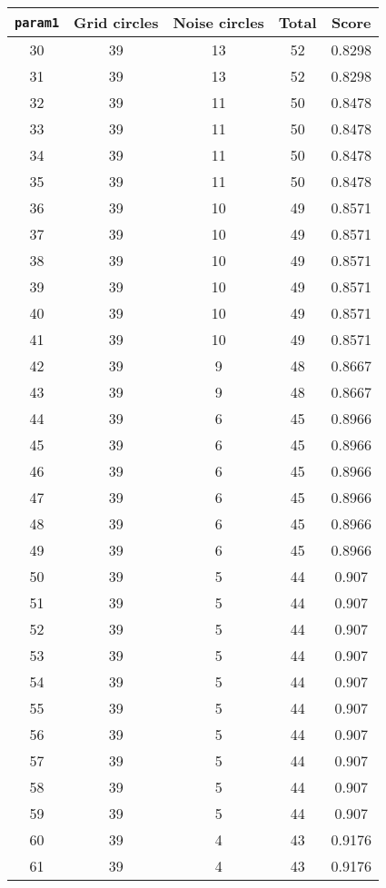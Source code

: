 \documentclass[letterpaper, 12pt]{article}
\begin{document}
\begin{longtable}{|c|c|c|c|c|}
\hline
\textbf{\texttt{param1}} & \textbf{Grid circles} & \textbf{Noise circles} & \textbf{Total} & \textbf{Score} \\
\hline
30 & 39 & 13 & 52 & 0.8298 \\
\hline
31 & 39 & 13 & 52 & 0.8298 \\
\hline
32 & 39 & 11 & 50 & 0.8478 \\
\hline
33 & 39 & 11 & 50 & 0.8478 \\
\hline
34 & 39 & 11 & 50 & 0.8478 \\
\hline
35 & 39 & 11 & 50 & 0.8478 \\
\hline
36 & 39 & 10 & 49 & 0.8571 \\
\hline
37 & 39 & 10 & 49 & 0.8571 \\
\hline
38 & 39 & 10 & 49 & 0.8571 \\
\hline
39 & 39 & 10 & 49 & 0.8571 \\
\hline
40 & 39 & 10 & 49 & 0.8571 \\
\hline
41 & 39 & 10 & 49 & 0.8571 \\
\hline
42 & 39 & 9 & 48 & 0.8667 \\
\hline
43 & 39 & 9 & 48 & 0.8667 \\
\hline
44 & 39 & 6 & 45 & 0.8966 \\
\hline
45 & 39 & 6 & 45 & 0.8966 \\
\hline
46 & 39 & 6 & 45 & 0.8966 \\
\hline
47 & 39 & 6 & 45 & 0.8966 \\
\hline
48 & 39 & 6 & 45 & 0.8966 \\
\hline
49 & 39 & 6 & 45 & 0.8966 \\
\hline
50 & 39 & 5 & 44 & 0.907 \\
\hline
51 & 39 & 5 & 44 & 0.907 \\
\hline
52 & 39 & 5 & 44 & 0.907 \\
\hline
53 & 39 & 5 & 44 & 0.907 \\
\hline
54 & 39 & 5 & 44 & 0.907 \\
\hline
55 & 39 & 5 & 44 & 0.907 \\
\hline
56 & 39 & 5 & 44 & 0.907 \\
\hline
57 & 39 & 5 & 44 & 0.907 \\
\hline
58 & 39 & 5 & 44 & 0.907 \\
\hline
59 & 39 & 5 & 44 & 0.907 \\
\hline
60 & 39 & 4 & 43 & 0.9176 \\
\hline
61 & 39 & 4 & 43 & 0.9176 \\

\end{longtable}
\end{document}
